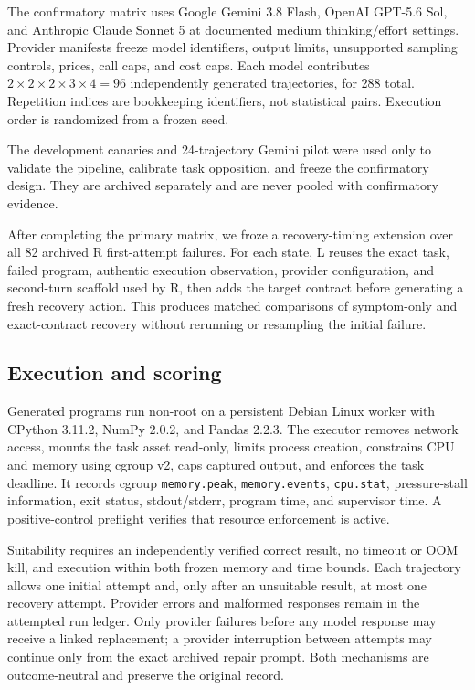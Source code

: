 \documentclass[sigconf,anonymous]{aamas}
\begin{document}
The confirmatory matrix uses Google Gemini 3.8 Flash, OpenAI GPT-5.6 Sol, and
Anthropic Claude Sonnet 5 at documented medium thinking/effort settings. Provider
manifests freeze model identifiers, output limits, unsupported sampling controls,
prices, call caps, and cost caps. Each model contributes
$2\times2\times2\times3\times4=96$ independently generated trajectories, for 288
total. Repetition indices are bookkeeping identifiers, not statistical pairs.
Execution order is randomized from a frozen seed.

The development canaries and 24-trajectory Gemini pilot were used only to validate
the pipeline, calibrate task opposition, and freeze the confirmatory design. They
are archived separately and are never pooled with confirmatory evidence.

After completing the primary matrix, we froze a recovery-timing extension over
all 82 archived R first-attempt failures. For each state, L reuses the exact task,
failed program, authentic execution observation, provider configuration, and
second-turn scaffold used by R, then adds the target contract before generating a
fresh recovery action. This produces matched comparisons of symptom-only and
exact-contract recovery without rerunning or resampling the initial failure.

\subsection{Execution and scoring}

Generated programs run non-root on a persistent Debian Linux worker with CPython
3.11.2, NumPy 2.0.2, and Pandas 2.2.3. The executor removes network access, mounts
the task asset read-only, limits process creation, constrains CPU and memory using
cgroup v2, caps captured output, and enforces the task deadline. It records cgroup
\texttt{memory.peak}, \texttt{memory.events}, \texttt{cpu.stat}, pressure-stall
information, exit status, stdout/stderr, program time, and supervisor time. A
positive-control preflight verifies that resource enforcement is active.

Suitability requires an independently verified correct result, no timeout or OOM
kill, and execution within both frozen memory and time bounds. Each trajectory
allows one initial attempt and, only after an unsuitable result, at most one
recovery attempt. Provider errors and malformed responses remain in the attempted
run ledger. Only provider failures before any model response may receive a linked
replacement; a provider interruption between attempts may continue only from the
exact archived repair prompt. Both mechanisms are outcome-neutral and preserve
the original record.
\end{document}
